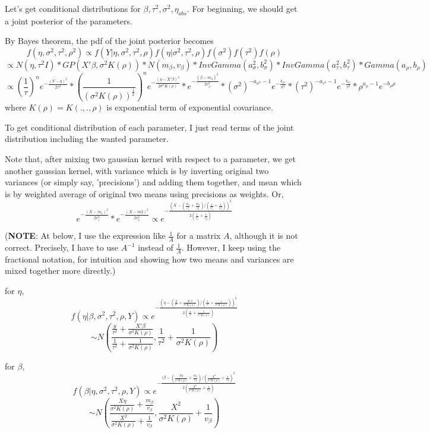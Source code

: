 \documentclass{article}
\begin{document}
Let's get conditional distributions for $\beta, \tau^2, \sigma^2, \eta_{obs}$.
For beginning, we should get a joint posterior of the parameters.

By Bayes theorem, the pdf of the joint posterior becomes
\[f(\eta,\sigma^2,\tau^2,\rho^2)
    \propto f(Y|\eta,\sigma^2,\tau^2,\rho)f(\eta|\sigma^2,\tau^2,\rho)f(\sigma^2)f(\tau^2)f(\rho)\]
\[\propto N(\eta,\tau^2I) * GP(X'\beta, \sigma^2 K(\rho))
    * N(m_\beta,v_\beta) * InvGamma(a_\sigma^2, b_\sigma^2) * InvGamma(a_\tau^2, b_\tau^2)
    * Gamma(a_\rho, b_\rho) \]
\[\propto (\frac{1}{\tau})^n e^{-\frac{(Y-\eta)^2}{2\tau^2}}
    * (\frac{1}{(\sigma^2 K(\rho))^{\frac{1}{2}}})^n e^{-\frac{(\eta-X'\beta)^2}{2\sigma^2 K(\rho)}}
    * e^{-\frac{(\beta-m_\beta)^2}{2v_\beta^2}}
    * (\sigma^2)^{-a_{\sigma^2}-1} e^{-\frac{b_{\sigma^2}}{\sigma^2}}
    * (\tau^2)^{-a_{\tau^2}-1} e^{-\frac{b_{\tau^2}}{\tau^2}}
    * \rho^{a_{\rho}-1} e^{-b_{\rho}\rho}
    \]
where $K(\rho)=K(.,.,\rho)$ is exponential term of exponential covariance.

To get conditional distribution of each parameter, I just read terms of the joint distribution
including the wanted parameter. 

Note that, after mixing two gaussian kernel with respect to a parameter,
we get another gaussian kernel, with variance which is by inverting original two variances (or simply say, 'precisions') and adding them together,
and mean which is by weighted average of original two means using precisions as weights. Or,
\[e^{-\frac{(X-m_1)^2}{2v_1^2}} * e^{-\frac{(X-m2)^2}{2v_2^2}}
    \propto e^{-\frac{(X-(\frac{m_1}{v_1^2} + \frac{m_2}{v_2^2})/(\frac{1}{v_1^2} + \frac{1}{v_2^2}))^2}{2(\frac{1}{v_1^2}+\frac{1}{v_2^2})}}\]

\clearpage
(\textbf{NOTE}: At below, I use the expression like $\frac{1}{A}$ for a matrix $A$, although it is not correct. 
Precisely, I have to use $A^{-1}$ instead of $\frac{1}{A}$.
However, I keep using the fractional notation, for intuition and showing how two means and variances are mixed together more directly.)

for $\eta$,
\[f(\eta|\beta,\sigma^2,\tau^2,\rho,Y) \propto e^{-\frac{(\eta - (\frac{y}{\tau^2} + \frac{X'\beta}{\sigma^2 K(\rho)}) / (\frac{1}{\tau^2}+\frac{1}{\sigma^2 K(\rho)}))^2}{2(\frac{1}{\tau^2}+\frac{1}{\sigma^2 K(\rho)})}}
\]
\[\sim N(\frac{\frac{y}{\tau^2} + \frac{X'\beta}{\sigma^2 K(\rho)}}{\frac{1}{\tau^2}+\frac{1}{\sigma^2 K(\rho)}}, \frac{1}{\tau^2}+\frac{1}{\sigma^2 K(\rho)})\]

for $\beta$,
\[f(\beta|\eta,\sigma^2,\tau^2,\rho,Y) \propto e^{-\frac{(\beta - (\frac{X\eta}{\sigma^2 K(\rho)} + \frac{m_\beta}{v_\beta}) / (\frac{X^2}{\sigma^2 K(\rho)}+\frac{1}{v_\beta})^2}{2(\frac{X^2}{\sigma^2 K(\rho)}+\frac{1}{v_\beta})}}
\]
\[\sim N(\frac{\frac{X\eta}{\sigma^2 K(\rho)} + \frac{m_\beta}{v_\beta}}{\frac{X^2}{\sigma^2 K(\rho)}+\frac{1}{v_\beta}}, \frac{X^2}{\sigma^2 K(\rho)}+\frac{1}{v_\beta})\]
\end{document}
